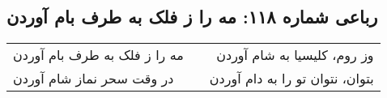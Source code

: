 \begin{center}
\section*{رباعی شماره ۱۱۸: مه را ز فلک به طرف بام آوردن}
\label{sec:118}
\begin{longtable}{l p{0.5cm} r}
مه را ز فلک به طرف بام آوردن
&&
وز روم، کلیسیا به شام آوردن
\\
در وقت سحر نماز شام آوردن
&&
بتوان، نتوان تو را به دام آوردن
\\
\end{longtable}
\end{center}
